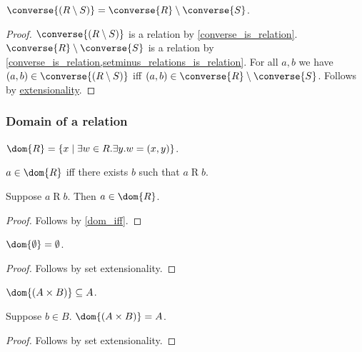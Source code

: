 \begin{proposition}\label{converse_setminus}
    $\converse{(R\setminus S)} = \converse{R}\setminus\converse{S}$.
\end{proposition}
\begin{proof}
    $\converse{(R\setminus S)}$ is a relation by \cref{converse_is_relation}.
    $\converse{R}\setminus\converse{S}$ is a relation by \cref{converse_is_relation,setminus_relations_is_relation}.
    For all $a,b$ we have $(a,b)\in\converse{(R\setminus S)}$ iff $(a,b)\in\converse{R}\setminus\converse{S}$.
    Follows by \hyperref[relext]{extensionality}.
\end{proof}



\subsubsection{Domain of a relation}

\begin{definition}\label{dom}
    $\dom{R} = \{ x\mid \exists w\in R. \exists y. w = (x, y)\}$.
\end{definition}

\begin{proposition}\label{dom_iff}
    $a\in\dom{R}$ iff there exists $b$ such that $a\mathrel{R} b$.
\end{proposition}

\begin{proposition}\label{dom_intro}
    Suppose $a\mathrel{R} b$.
    Then $a\in\dom{R}$.
\end{proposition}
\begin{proof}
    Follows by \cref{dom_iff}.
\end{proof}

\begin{proposition}\label{dom_emptyset}
    $\dom{\emptyset} = \emptyset$.
\end{proposition}
\begin{proof}
    Follows by set extensionality.
\end{proof}

\begin{proposition}\label{dom_times}
    $\dom{(A\times B)}\subseteq A$.
\end{proposition}

\begin{proposition}\label{dom_times_inhabited}
    Suppose $b\in B$.
    $\dom{(A\times B)} = A$.
\end{proposition}
\begin{proof}
    Follows by set extensionality.
\end{proof}

